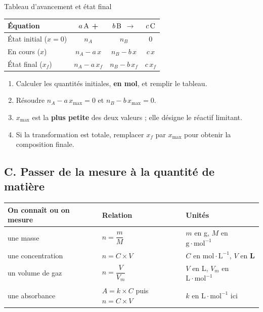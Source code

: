 \documentclass[11pt,a4paper]{article}
\newcommand{\molL}{\text{mol}\cdot\text{L}^{-1}}
\newcommand{\gmol}{\text{g}\cdot\text{mol}^{-1}}
\begin{document}
\begin{methode}{Tableau d'avancement et état final}
\begin{center}
\begin{tabular}{lccc}
\toprule
Équation & $a\,\ce{A}$ \;+ & $b\,\ce{B}$ \;$\to$ & $c\,\ce{C}$ \\
\midrule
État initial ($x=0$) & $n_A$ & $n_B$ & $0$ \\
En cours ($x$) & $n_A - a\,x$ & $n_B - b\,x$ & $c\,x$ \\
État final ($x_f$) & $n_A - a\,x_f$ & $n_B - b\,x_f$ & $c\,x_f$ \\
\bottomrule
\end{tabular}
\end{center}
\begin{enumerate}
  \item Calculer les quantités initiales, \textbf{en mol}, et remplir le tableau.
  \item Résoudre $n_A - a\,x_{\max} = 0$ et $n_B - b\,x_{\max} = 0$.
  \item $x_{\max}$ est la \textbf{plus petite} des deux valeurs ; elle désigne le réactif limitant.
  \item Si la transformation est totale, remplacer $x_f$ par $x_{\max}$ pour obtenir la composition finale.
\end{enumerate}
\end{methode}

\subsection*{C. Passer de la mesure à la quantité de matière}

\begin{center}
\begin{tabular}{lll}
\toprule
On connaît ou on mesure & Relation & Unités \\
\midrule
une masse & $n = \dfrac{m}{M}$ & $m$ en g, $M$ en $\gmol$ \\[6pt]
une concentration & $n = C \times V$ & $C$ en $\molL$, $V$ en \textbf{L} \\[6pt]
un volume de gaz & $n = \dfrac{V}{V_m}$ & $V$ en L, $V_m$ en $\text{L}\cdot\text{mol}^{-1}$ \\[6pt]
une absorbance & $A = k \times C$ puis $n = C \times V$ & $k$ en $\text{L}\cdot\text{mol}^{-1}$ ici \\
\bottomrule
\end{tabular}
\end{center}
\end{document}
